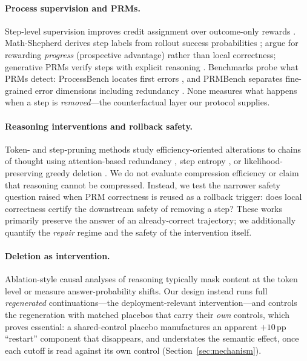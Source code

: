\documentclass[11pt]{article}
\begin{document}
\paragraph{Process supervision and PRMs.}
Step-level supervision improves credit assignment over outcome-only rewards \citep{uesato2022solving,lightman2024lets,cobbe2021training}. Math-Shepherd derives step labels from rollout success probabilities \citep{wang2024mathshepherd}; \citet{setlur2025rewarding} argue for rewarding \emph{progress} (prospective advantage) rather than local correctness; generative PRMs verify steps with explicit reasoning \citep{khalifa2025process}. Benchmarks probe what PRMs detect: ProcessBench locates first errors \citep{zheng2025processbench}, and PRMBench separates fine-grained error dimensions including redundancy \citep{song2025prmbench}. None measures what happens when a step is \emph{removed}---the counterfactual layer our protocol supplies.

\paragraph{Reasoning interventions and rollback safety.}
Token- and step-pruning methods study efficiency-oriented alterations to chains of thought using attention-based redundancy \citep{choi2025think}, step entropy \citep{li2025compressing}, or likelihood-preserving greedy deletion \citep{singh2026llms}. We do not evaluate compression efficiency or claim that reasoning cannot be compressed. Instead, we test the narrower safety question raised when PRM correctness is reused as a rollback trigger: does local correctness certify the downstream safety of removing a step? These works primarily preserve the answer of an already-correct trajectory; we additionally quantify the \emph{repair} regime and the safety of the intervention itself.

\paragraph{Deletion as intervention.}
Ablation-style causal analyses of reasoning typically mask content at the token level or measure answer-probability shifts. Our design instead runs full \emph{regenerated} continuations---the deployment-relevant intervention---and controls the regeneration with matched placebos that carry their \emph{own} controls, which proves essential: a shared-control placebo manufactures an apparent $+10$\,pp ``restart'' component that disappears, and understates the semantic effect, once each cutoff is read against its own control (Section~\ref{sec:mechanism}).
\end{document}
